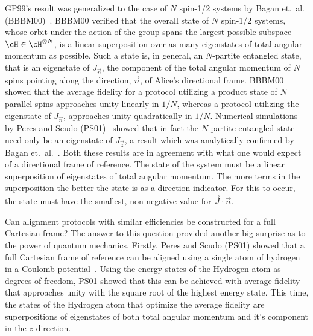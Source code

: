 GP99's result was generalized to the case of $N$ spin-1/2 systems by Bagan et.~al.~ (BBBM00)~\cite{BBBM00}. BBBM00 verified that the overall state of $N$ spin-1/2 systems, whose orbit under the action of the group spans the largest possible subspace $\cH\in\cH^{\otimes N}$, is a linear superposition over as many eigenstates of total angular momentum as possible.  Such a state is, in general, an $N$-partite entangled state, that is an eigenstate of $J_{\vec{n}}$, the component of the total angular momentum of $N$ spins pointing along the direction, $\vec{n}$, of Alice's directional frame.  BBBM00 showed that the average fidelity for a protocol utilizing a product state of $N$ parallel spins approaches unity linearly in $1/N$, whereas a protocol utilizing the eigenstate of $J_{\vec{n}}$, approaches unity quadratically in $1/N$. Numerical simulations by Peres and Scudo (PS01)~\cite{PS01a} showed that in fact the $N$-partite entangled state need only be an eigenstate of $J_{\vec{z}}$, a result which was analytically confirmed by Bagan et.~al.~\cite{BBBMT01}.  Both these results are in agreement with what one would expect of a directional frame of reference.  The state of the system must be a linear superposition of eigenstates of total angular momentum.  The more terms in the superposition the better the state is as a direction indicator.  For this to occur, the state must have the smallest, non-negative value for $\vec{J}\cdot\vec{n}$.   

Can alignment protocols with similar efficiencies be constructed for a full Cartesian frame?  The answer to this question provided another big surprise as to the power of quantum mechanics.  Firstly, Peres and Scudo (PS01) showed that a full Cartesian frame of reference can be aligned using a single atom of hydrogen in a Coulomb potential~\cite{PS01b}. Using the energy states of the Hydrogen atom as degrees of freedom, PS01 showed that this can be achieved with average fidelity that approaches unity with the square root of the highest energy state. This time, the states of the Hydrogen atom that optimize the average fidelity are superpositions of eigenstates of both total angular momentum and it's component in the $z$-direction.

